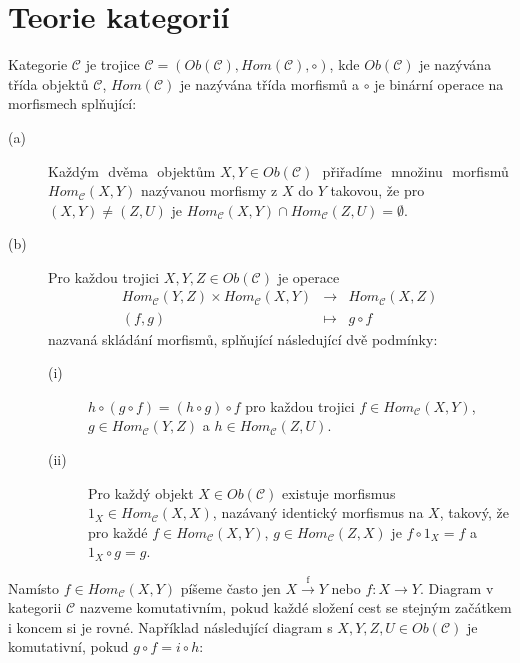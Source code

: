 \section{Teorie kategorií}

    \begin{dfn}
      Kategorie $\mathcal C$ je trojice $\mathcal C=(Ob(\mathcal C), Hom(\mathcal C), 
      \circ)$, kde $Ob(\mathcal C)$ je nazývána třída objektů $\mathcal C$, $Hom(\mathcal C)$ 
      je nazývána třída morfismů a $\circ$ je binární operace na morfismech 
      splňující:      
      \begin{description}
        \item[(a)] Každým\,\, dvěma\,\, objektům $X,Y\in Ob(\mathcal C)$\,\, přiřadíme\,\, množinu\,\, 
          morfismů $Hom_{\mathcal C}(X,Y)$ nazývanou morfismy z $X$ do $Y$ takovou, že 
          pro $(X,Y)\neq (Z,U)$ je $Hom_{\mathcal C}(X,Y) \cap Hom_{\mathcal C}(Z,U)= 
          \emptyset$.
        \item[(b)] Pro každou trojici $X,Y,Z\in Ob(\mathcal C)$ je operace
          \begin{eqnarray}
             Hom_{\mathcal C}(Y,Z) \times Hom_{\mathcal C}(X,Y)  &\to& Hom_{\mathcal C}(X,Z) \nonumber \\
             (f,g) &\mapsto&  g\circ f \nonumber
          \end{eqnarray}
            nazvaná skládání morfismů, splňující následující dvě podmínky:
          \begin{description}
            \item[(i)] $h\circ(g\circ f)=(h\circ g)\circ f$ pro každou trojici $f\in Hom_{\mathcal 
              C}(X,Y)$, $g\in Hom_{\mathcal C}(Y,Z)$ a $h\in Hom_{\mathcal 
              C}(Z,U)$.
            \item[(ii)] Pro každý objekt $X\in Ob(\mathcal C)$ existuje morfismus $1_X\in Hom_{\mathcal C}(X,X)$,
              nazávaný identický morfismus na $X$, takový, že pro každé $f\in Hom_{\mathcal 
              C}(X,Y)$, $g\in Hom_{\mathcal C}(Z,X)$ je $f\circ 1_X=f$ a $1_X\circ g=g$.         
          \end{description}
      \end{description}
      
      Namísto $f\in Hom_{\mathcal C}(X,Y)$ píšeme často jen $X\xrightarrow{\text{f}}Y$ 
      nebo $f:X\to Y$. Diagram v kategorii $\mathcal C$ nazveme komutativním, 
      pokud každé složení cest se stejným začátkem i koncem si je rovné. 
      Například následující diagram s $X,Y,Z,U\in Ob(\mathcal C)$ je 
      komutativní, pokud $g\circ f=i\circ h$: \\\\
       \centerline{}\\\\
    \end{dfn}
    
